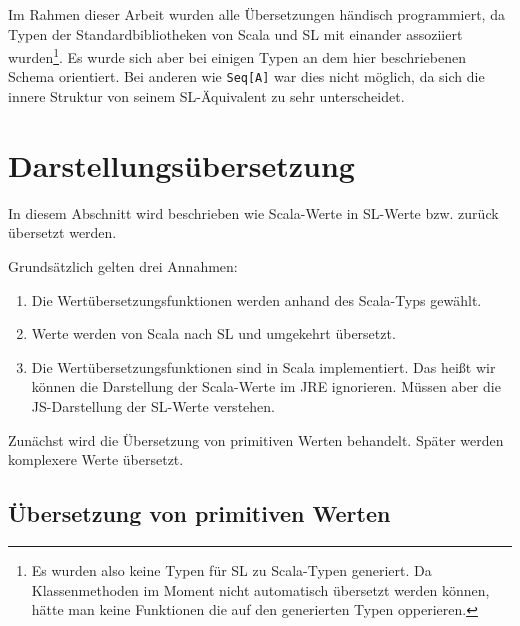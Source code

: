\documentclass[12pt,bibtotoc]{scrreprt}
\begin{document}
Im Rahmen dieser Arbeit wurden alle Übersetzungen händisch programmiert, da Typen der Standardbibliotheken von Scala und SL mit einander assoziiert wurden\footnote{Es wurden also keine Typen für SL zu Scala-Typen generiert. Da Klassenmethoden im Moment nicht automatisch übersetzt werden können, hätte man keine Funktionen die auf den generierten Typen opperieren.}. Es wurde sich aber bei einigen Typen an dem hier beschriebenen Schema orientiert. Bei anderen wie \lstinline!Seq[A]! war dies nicht möglich, da sich die innere Struktur von seinem SL-Äquivalent zu sehr unterscheidet.


\section{Darstellungsübersetzung}
\label{sec:value-transformation}

In diesem Abschnitt wird beschrieben wie Scala-Werte in SL-Werte bzw. zurück übersetzt werden. 

Grundsätzlich gelten drei Annahmen: 
\begin{enumerate}
 \item Die Wertübersetzungsfunktionen werden anhand des Scala-Typs gewählt.
 \item Werte werden von Scala nach SL und umgekehrt übersetzt.
 \item Die Wertübersetzungsfunktionen sind in Scala implementiert. Das heißt wir können die Darstellung der Scala-Werte im JRE ignorieren. Müssen aber die JS-Darstellung der SL-Werte verstehen.
\end{enumerate}

Zunächst wird die Übersetzung von primitiven Werten behandelt. Später werden komplexere Werte übersetzt.

\subsection{Übersetzung von primitiven Werten}
\label{subsec:primitive-value-translation}
\end{document}
